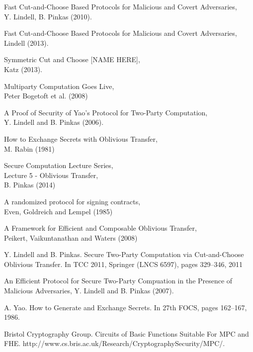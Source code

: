 \documentclass[a4paper,11pt]{article}
\begin{document}

	\begin{thebibliography}{5}
			Fast Cut-and-Choose Based Protocols for Malicious and Covert Adversaries,\\
			Y. Lindell, B. Pinkas (2010).

			Fast Cut-and-Choose Based Protocols for Malicious and Covert Adversaries,\\
			Lindell (2013).

			Symmetric Cut and Choose [NAME HERE],\\
			Katz (2013).

			Multiparty Computation Goes Live,\\
			Peter Bogetoft et al. (2008)

			A Proof of Security of Yao’s Protocol for Two-Party Computation,\\
			Y. Lindell and B. Pinkas (2006).
    
			How to Exchange Secrets with Oblivious Transfer,\\
			M. Rabin (1981)

			Secure Computation Lecture Series,\\
			Lecture 5 - Oblivious Transfer,\\
			B. Pinkas (2014)

			A randomized protocol for signing contracts,\\
			Even, Goldreich and Lempel (1985)

 			A Framework for Efficient and Composable Oblivious Transfer,\\
			Peikert, Vaikuntanathan and Waters (2008)

			Y. Lindell and B. Pinkas. Secure Two-Party Computation via Cut-and-Choose Oblivious Transfer. In TCC 2011, Springer (LNCS 6597), pages 329–346, 2011
			
			An Efficient Protocol for Secure Two-Party Compuation in the Presence of Malicious Adversaries,
			Y. Lindell and B. Pinkas (2007).

			A. Yao. How to Generate and Exchange Secrets. In 27th FOCS, pages 162–167, 1986.

			Bristol Cryptography Group. Circuits of Basic Functions Suitable For MPC and FHE. http://www.cs.bris.ac.uk/Research/CryptographySecurity/MPC/. 

	\end{thebibliography}
\end{document}
